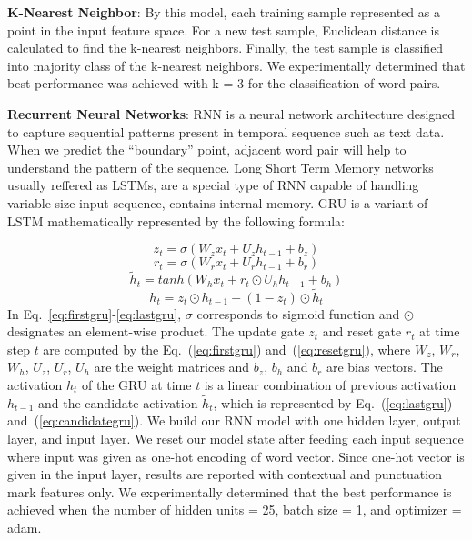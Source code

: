 \documentclass{amia}
\begin{document}
\textbf{K-Nearest Neighbor}: By this model, each training sample represented as a point in the input feature space. For a new test sample, Euclidean distance is calculated to find the k-nearest neighbors. Finally, the test sample is classified into majority class of the k-nearest neighbors. We experimentally determined that best performance was achieved with k = 3 for the classification of word pairs. 

\textbf{Recurrent Neural Networks}: RNN is a neural network architecture designed to capture sequential patterns present in temporal sequence such as text data. When we predict the ``boundary'' point, adjacent word pair will help to understand the pattern of the sequence. Long Short Term Memory networks usually reffered as LSTMs\cite{hochreiter1997long}, are a special type of RNN capable of handling variable size input sequence, contains internal memory. GRU\cite{cho2014properties} is a variant of LSTM mathematically represented by the following formula:

\begin{equation}
z_t = \sigma(W_zx_t + U_zh_{t-1} + b_z)
\label{eq:firstgru}
\end{equation}
\begin{equation}
r_t = \sigma(W_rx_t + U_rh_{t-1} + b_r)
\label{eq:resetgru}
\end{equation}
\begin{equation}
\tilde h_t = tanh(W_hx_t + r_t \odot U_hh_{t-1} + b_h) 
\label{eq:candidategru}
\end{equation}
\begin{equation}
h_t = z_t \odot h_{t-1} + (1-z_t) \odot \tilde h_t
\label{eq:lastgru}
\end{equation}  
In Eq.~\ref{eq:firstgru}-\ref{eq:lastgru}, $\sigma$ corresponds to sigmoid function and $\odot$ designates an element-wise product. The update gate $z_t$ and reset gate $r_t$ at time step $t$ are computed by the Eq.~(\ref{eq:firstgru}) and~(\ref{eq:resetgru}), where $W_z$, $W_r$, $W_h$, $U_z$, $U_r$, $U_h$ are the weight matrices and $b_z$, $b_h$ and $b_r$ are bias vectors. The activation $h_t$ of the GRU at time $t$ is a linear combination of previous activation $h_{t-1}$ and the candidate activation $\tilde h_t$, which is represented by Eq.~(\ref{eq:lastgru}) and~(\ref{eq:candidategru}). We build our RNN model with one hidden layer, output layer, and input layer. We reset our model state after feeding each input sequence where input was given as one-hot encoding of word vector. Since one-hot vector is given in the input layer, results are reported with contextual and punctuation mark features only. We experimentally determined that the best performance is achieved when the number of hidden units = 25, batch size = 1, and optimizer = adam.         
  
\end{document}
